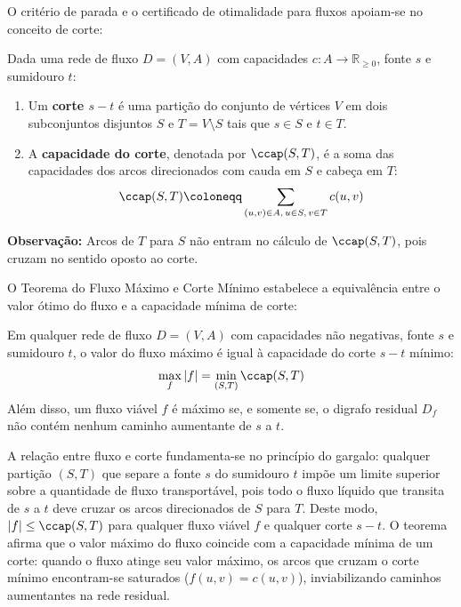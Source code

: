 O critério de parada e o certificado de otimalidade para fluxos apoiam-se no conceito de corte:

\begin{definicao}
Dada uma rede de fluxo $D = (V, A)$ com capacidades $c: A \to \mathbb{R}_{\ge 0}$, fonte $s$ e sumidouro $t$:
\begin{enumerate}
    \item Um \textbf{corte $s-t$} é uma partição do conjunto de vértices $V$ em dois subconjuntos disjuntos $S$ e $T = V \setminus S$ tais que $s \in S$ e $t \in T$.
    \item A \textbf{capacidade do corte}, denotada por $\ccap(S, T)$, é a soma das capacidades dos arcos direcionados com cauda em $S$ e cabeça em $T$:
    \begin{equation}
        \ccap(S, T) \coloneqq \sum_{(u,v) \in A, \, u \in S, \, v \in T} c(u,v)
    \end{equation}
\end{enumerate}
\textbf{Observação:} Arcos de $T$ para $S$ não entram no cálculo de $\ccap(S, T)$, pois cruzam no sentido oposto ao corte.
\end{definicao}

O Teorema do Fluxo Máximo e Corte Mínimo estabelece a equivalência entre o valor ótimo do fluxo e a capacidade mínima de corte:

\begin{teorema}
Em qualquer rede de fluxo $D = (V, A)$ com capacidades não negativas, fonte $s$ e sumidouro $t$, o valor do fluxo máximo é igual à capacidade do corte $s-t$ mínimo:
\begin{equation}
    \max_f |f| = \min_{(S,T)} \ccap(S,T)
\end{equation}
Além disso, um fluxo viável $f$ é máximo se, e somente se, o digrafo residual $D_f$ não contém nenhum caminho aumentante de $s$ a $t$.
\end{teorema}

 A relação entre fluxo e corte fundamenta-se no princípio do gargalo: qualquer partição $(S, T)$ que separe a fonte $s$ do sumidouro $t$ impõe um limite superior sobre a quantidade de fluxo transportável, pois todo o fluxo líquido que transita de $s$ a $t$ deve cruzar os arcos direcionados de $S$ para $T$. Deste modo, $|f| \le \ccap(S, T)$ para qualquer fluxo viável $f$ e qualquer corte $s-t$. O teorema afirma que o valor máximo do fluxo coincide com a capacidade mínima de um corte: quando o fluxo atinge seu valor máximo, os arcos que cruzam o corte mínimo encontram-se saturados ($f(u,v) = c(u,v)$), inviabilizando caminhos aumentantes na rede residual.


